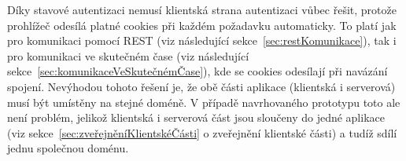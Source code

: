 Díky stavové autentizaci nemusí klientská strana autentizaci vůbec řešit, protože prohlížeč odesílá platné cookies při každém požadavku automaticky.
To platí jak pro komunikaci pomocí \gls{REST} (viz následující sekce~\ref{sec:restKomunikace}), tak i pro komunikaci ve skutečném čase (viz následující sekce~\ref{sec:komunikaceVeSkutečnémČase}), kde se cookies odesílají při navázání spojení.
Nevýhodou tohoto řešení je, že obě části aplikace (klientská i serverová) musí být umístěny na stejné doméně.
V případě navrhovaného prototypu toto ale není problém, jelikož klientská i serverová část jsou sloučeny do jedné aplikace (viz sekce~\ref{sec:zveřejněníKlientskéČásti} o zveřejnění klientské části) a tudíž sdílí jednu společnou doménu.
